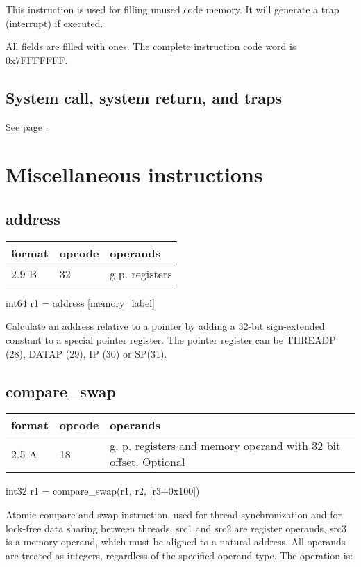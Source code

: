 \documentclass[forwardcom.tex]{subfiles}
\begin{document}
This instruction is used for filling unused code memory. It will generate a trap (interrupt) if executed.
\vv

All fields are filled with ones. The complete instruction code word is 0x7FFFFFFF.
\vv


\subsection{System call, system return, and traps}
See page \pageref{table:sysCallInstruction}.
\vv


\section{Miscellaneous instructions}

\subsection{address}
\label{table:addressInstruction}
\begin{tabular}{|p{12mm}|p{15mm}|p{100mm}|}
\hline
\bfseries format & \bfseries opcode & \bfseries operands \\ \hline
2.9 B & 32 & g.p. registers \\ \hline
\end{tabular}
\vv

int64 r1 = address [memory\_label]
\vv

Calculate an address relative to a pointer by adding a 32-bit sign-extended constant to a special pointer register. The pointer register can be THREADP (28), DATAP (29), IP (30) or SP(31).
\vv


\subsection{compare\_swap}
\label{table:compareSwapInstruction}
\begin{tabular}{|p{12mm}|p{15mm}|p{100mm}|}
\hline
\bfseries format & \bfseries opcode & \bfseries operands \\ \hline
2.5 A & 18 & g. p. registers and memory operand with 32 bit offset. Optional \\ \hline
\end{tabular}
\vv

int32 r1 = compare\_swap(r1, r2, [r3+0x100])
\vv

Atomic compare and swap instruction, used for thread synchronization and for lock-free data sharing between threads. src1 and src2 are register operands, src3 is a memory operand, which must be aligned to a natural address. All operands are treated as integers, regardless of the specified operand type. The operation is:
\end{document}
